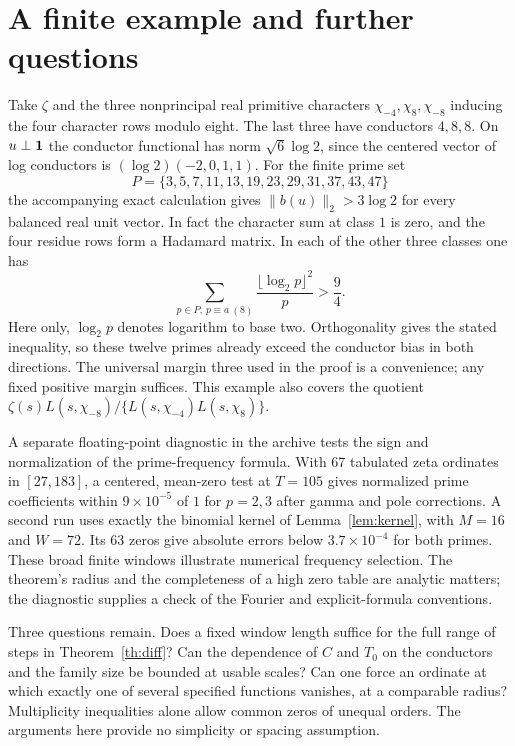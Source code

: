 \documentclass[11pt]{article}
\begin{document}


\section{A finite example and further questions}
Take $\zeta$ and the three nonprincipal real primitive characters
$\chi_{-4},\chi_8,\chi_{-8}$ inducing the four character rows modulo
eight. The last three have conductors $4,8,8$. On $u\perp\mathbf 1$ the
conductor functional has norm $\sqrt6\log2$, since the centered vector of
log conductors is $(\log2)(-2,0,1,1)$. For the finite prime set
\[
 P=\{3,5,7,11,13,19,23,29,31,37,43,47\}
\]
the accompanying exact calculation gives $\|b(u)\|_2>3\log2$ for every
balanced real unit vector. In fact the character sum at class $1$ is zero,
and the four residue rows form a Hadamard matrix. In each of the other
three classes one has
\[
  \sum_{p\in P,\,p\equiv a\ (8)}
     \frac{\lfloor\log_2 p\rfloor^2}{p} > \frac94.
\]
Here only, $\log_2 p$ denotes logarithm to base two. Orthogonality gives
the stated inequality, so these twelve primes already exceed the conductor
bias in both directions. The universal margin three used in the proof is
a convenience; any fixed positive margin suffices. This example also
covers the quotient $\zeta(s)L(s,\chi_{-8})/
\{L(s,\chi_{-4})L(s,\chi_8)\}$.

A separate floating-point diagnostic in the archive tests the sign and
normalization of the prime-frequency formula. With 67 tabulated zeta
ordinates in $[27,183]$, a centered, mean-zero test at $T=105$ gives
normalized prime coefficients within $9\times10^{-5}$ of $1$ for
$p=2,3$ after gamma and pole corrections. A second run uses exactly the binomial kernel of Lemma~\ref{lem:kernel}, with $M=16$ and $W=72$. Its 63 zeros give absolute errors below $3.7\times10^{-4}$ for both primes. These broad finite windows illustrate numerical frequency selection. The theorem's radius and the completeness
of a high zero table are analytic matters; the diagnostic supplies a check
of the Fourier and explicit-formula conventions.

Three questions remain. Does a fixed window length suffice for the full range of steps in Theorem~\ref{th:diff}?
Can the dependence of $C$ and $T_0$ on the conductors and the family
size be bounded at usable scales? Can one force an ordinate at which
exactly one of several specified functions vanishes, at a comparable
radius? Multiplicity inequalities alone allow common zeros of unequal
orders. The arguments here provide no simplicity or spacing assumption.
\end{document}

